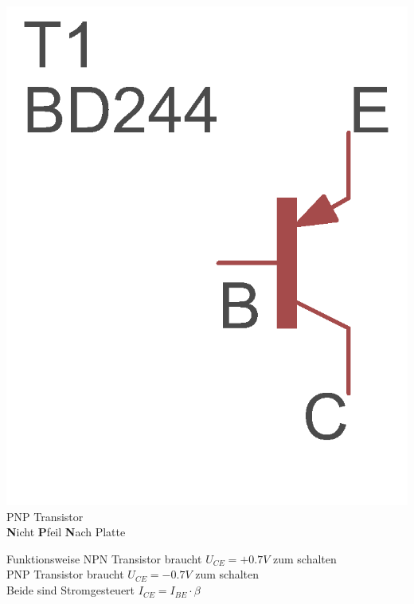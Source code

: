 \begin{frame}
\begin{minipage}{0.4\textwidth}
	\includegraphics[scale=1.4]{e13/PNP.png}\\
	PNP Transistor\\ \textbf{N}icht \textbf{P}feil \textbf{N}ach Platte
\end{minipage}

\begin{center}
\begin{block}{Funktionsweise}
NPN Transistor braucht $ U_{CE}=+0.7V$ zum schalten\\
PNP Transistor braucht $ U_{CE}=-0.7V$ zum schalten\\
Beide sind Stromgesteuert $I_{CE} = I_{BE} \cdot \beta$
\end{block}
\end{center}
\end{frame}

